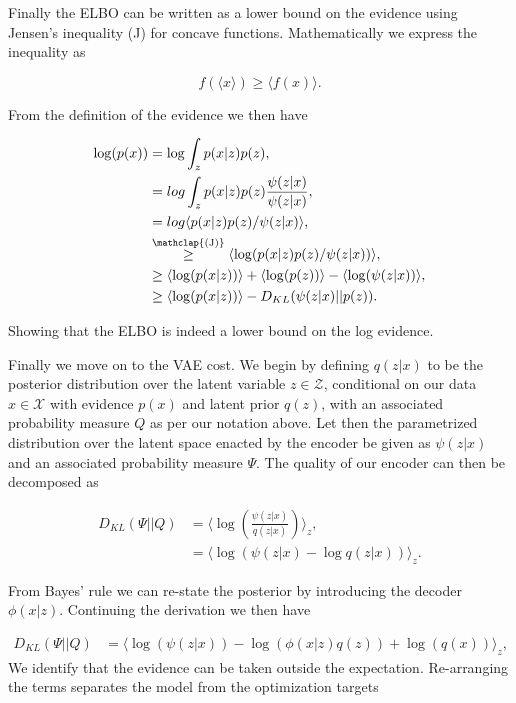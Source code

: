 \noindent Finally the ELBO can be written as a lower bound on the evidence using Jensen's inequality (J) for concave functions. Mathematically we express the inequality as 

\begin{equation}
f(\langle x\rangle) \geq \langle f(x) \rangle.
\end{equation}

\noindent From the definition of the evidence we then have

\begin{align}
\log (p(x)) &= \log \int_z p(x|z) p(z), \\
&= log \int _z p(x|z) p(z) \frac{\psi(z|x)}{\psi(z|x)},\\
& = log \langle p(x|z) p(z)/ \psi (z|x) \rangle, \\
&  \stackrel{\mathclap{\text{(J)}}}{\geq} \langle \log (p(x|z) p(z)/ \psi(z|x))\rangle,\\
& \geq \langle \log(p(x|z))\rangle + \langle \log(p(z))\rangle  - \langle \log(\psi (z|x))\rangle, \\
& \geq \langle \log(p(x|z))\rangle - D_{KL}(\psi (z|x) || p(z)).
\end{align}

\noindent Showing that the ELBO is indeed a lower bound on the log evidence. 

Finally we move on to the VAE cost. We begin by defining $q(z|x)$ to be the posterior distribution over the latent variable $z \in \mathcal{Z}$, conditional on our data $x \in \mathcal{X}$ with evidence $p(x)$ and latent prior $q(z)$, with an associated probability measure $Q$ as per our notation above. Let then the parametrized distribution over the latent space enacted by the encoder be given as $\psi(z|x)$ and an associated probability measure $\Psi$. The quality of our encoder can then be decomposed as 

\begin{align}
D_{KL}(\Psi || Q ) &= \langle \log \left(\frac{\psi(z|x)}{q(z|x)}\right) \rangle_z, \\
&= \langle \log \left(\psi(z|x)- \log q(z|x)\right) \rangle_z.
\end{align}

\noindent From Bayes' rule we can re-state the posterior by introducing the decoder $\phi(x|z)$. Continuing the derivation we then have 

\begin{align}
D_{KL}(\Psi || Q ) &=  \langle \log \left( \psi(z|x)\right)  - \log \left( \phi( x | z) q(z) \right) + \log (q(x))\rangle_z, 
\end{align}
\noindent We identify that the evidence can be taken outside the expectation. Re-arranging the terms separates the model from the optimization targets 

